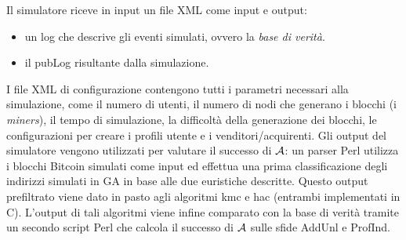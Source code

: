 Il simulatore riceve in input un file XML come input e output:
\begin{itemize}
    \item un log che descrive gli eventi simulati, ovvero la \emph{base di verità}.
    \item il pubLog risultante dalla simulazione.
\end{itemize}
I file XML di configurazione contengono tutti i parametri necessari alla simulazione, come il numero di utenti, il numero di nodi che generano i blocchi (i \emph{miners}), il tempo di simulazione, la difficoltà della generazione dei blocchi, le configurazioni per creare i profili utente e i venditori/acquirenti.
Gli output del simulatore vengono utilizzati per valutare il successo di $\mathcal{A}$: un parser Perl utilizza i blocchi Bitcoin simulati come input ed effettua una prima classificazione degli indirizzi simulati in GA in base alle due euristiche descritte.
Questo output prefiltrato viene dato in pasto agli algoritmi \gls{kmc} e \gls{hac} (entrambi implementati in C).
L'output di tali algoritmi viene infine comparato con la base di verità tramite un secondo script Perl che calcola il successo di $\mathcal{A}$ sulle sfide AddUnl e ProfInd.

